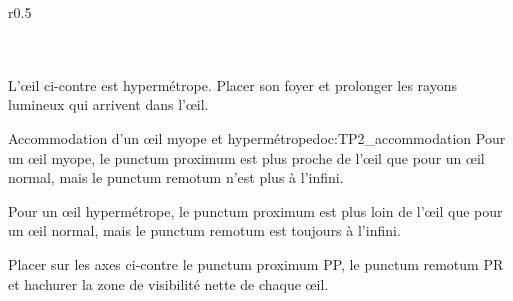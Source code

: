\begin{wrapfigure}[10]{r}{0.5\linewidth}
  \centering
  \vspace*{-2pt}
   \\
   \\[8pt]

   \\
\end{wrapfigure}

\mesure
L'œil ci-contre est hypermétrope.
Placer son foyer et prolonger les rayons lumineux qui arrivent dans l'œil.

\begin{doc}{Accommodation d'un œil myope et hypermétrope}{doc:TP2_accommodation}
  Pour un œil myope, le punctum proximum est plus proche de l'œil que pour un œil normal, mais le punctum remotum n'est plus à l'infini.

  Pour un œil hypermétrope, le punctum proximum est plus loin de l'œil que pour un œil normal, mais le punctum remotum est toujours à l'infini.
\end{doc}

\mesure 
Placer sur les axes ci-contre le punctum proximum PP, le punctum remotum PR et hachurer la zone de visibilité nette de chaque œil.